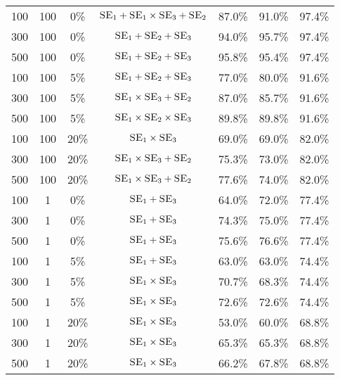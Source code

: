 \documentclass[a4paper,12pt ]{report}
\begin{document}
\begin{table}[h]
\begin{center}
{{\begin{tabular}{|c c  c | c |  c | c c| }
\hline
100& 100& 0\% & $\textsc{SE}_{1} + \textsc{SE}_{1} \times \textsc{SE}_{3} + \textsc{SE}_{2}$ &87.0\% & 91.0\% & 97.4\%   \\ 
300& 100& 0\% & $\textsc{SE}_{1} + \textsc{SE}_{2} + \textsc{SE}_{3}$ &94.0\% & 95.7\% & 97.4\%    \\
500& 100& 0\% & $\textsc{SE}_{1} + \textsc{SE}_{2} + \textsc{SE}_{3}$ &95.8\% & 95.4\% & 97.4\%  \\  \hline
100& 100& 5\% & $\textsc{SE}_{1} + \textsc{SE}_{2} + \textsc{SE}_{3}$ &77.0\% & 80.0\% & 91.6\%    \\
300& 100& 5\% & $\textsc{SE}_{1} \times \textsc{SE}_{3} + \textsc{SE}_{2}$ &87.0\% & 85.7\% & 91.6\%  \\    
500& 100& 5\% & $\textsc{SE}_{1} \times \textsc{SE}_{2} \times \textsc{SE}_{3}$ &89.8\% & 89.8\% & 91.6\%   \\  \hline
100& 100& 20\% & $\textsc{SE}_{1} \times \textsc{SE}_{3}$ &69.0\% & 69.0\% & 82.0\%    \\
300& 100& 20\% & $\textsc{SE}_{1} \times \textsc{SE}_{3} + \textsc{SE}_{2}$ &75.3\% & 73.0\% & 82.0\%    \\
500& 100& 20\% & $\textsc{SE}_{1} \times \textsc{SE}_{3} + \textsc{SE}_{2}$ &77.6\% & 74.0\% & 82.0\%   \\ \hline
100& 1& 0\% & $\textsc{SE}_{1} + \textsc{SE}_{3}$ &64.0\% & 72.0\% & 77.4\%    \\
300& 1& 0\% & $\textsc{SE}_{1} + \textsc{SE}_{3}$ &74.3\% & 75.0\% & 77.4\%    \\
500& 1& 0\% & $\textsc{SE}_{1} + \textsc{SE}_{3}$ &75.6\% & 76.6\% & 77.4\%  \\  \hline
100& 1& 5\% & $\textsc{SE}_{1} + \textsc{SE}_{3}$ &63.0\% & 63.0\% & 74.4\%    \\
300& 1& 5\% & $\textsc{SE}_{1} \times \textsc{SE}_{3}$ &70.7\% & 68.3\% &  74.4\%    \\
500& 1& 5\% & $\textsc{SE}_{1} \times \textsc{SE}_{3}$ &72.6\% & 72.6\% & 74.4\%  \\  \hline
100& 1& 20\% & $\textsc{SE}_{1} \times \textsc{SE}_{3}$ &53.0\% & 60.0\% & 68.8\%    \\
300& 1& 20\% & $\textsc{SE}_{1} \times \textsc{SE}_{3}$ &65.3\% & 65.3\% & 68.8\%    \\
500& 1& 20\% & $\textsc{SE}_{1} \times \textsc{SE}_{3}$ &66.2\% & 67.8\% & 68.8\%   \\
\hline

\end{tabular}
} }
\end{center}


\end{table}
\end{document}
